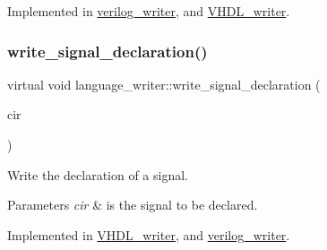 Implemented in \hyperlink{classverilog__writer_ab1e052e8bfd33f42202ec7c834c80039}{verilog\+\_\+writer}, and \hyperlink{structVHDL__writer_a24689039313dfd370692b4c13f2c8862}{V\+H\+D\+L\+\_\+writer}.

\mbox{\label{classlanguage__writer_ae574f2a7e9cb7904172ce08aab243f8e}} 
\subsubsection{\texorpdfstring{write\+\_\+signal\+\_\+declaration()}{write\_signal\_declaration()}}
{\footnotesize\ttfamily virtual void language\+\_\+writer\+::write\+\_\+signal\+\_\+declaration (\begin{DoxyParamCaption}\item[{const \hyperlink{structural__objects_8hpp_a8ea5f8cc50ab8f4c31e2751074ff60b2}{structural\+\_\+object\+Ref} \&}]{cir }\end{DoxyParamCaption})\hspace{0.3cm}{\ttfamily [pure virtual]}}



Write the declaration of a signal. 


\begin{DoxyParams}{Parameters}
{\em cir} & is the signal to be declared. \\
\hline
\end{DoxyParams}


Implemented in \hyperlink{structVHDL__writer_abbe0d08a850b90049d20cbc3ded0e132}{V\+H\+D\+L\+\_\+writer}, and \hyperlink{classverilog__writer_ad10d67870682d947144dac0629560742}{verilog\+\_\+writer}.

\mbox{\label{classlanguage__writer_a3325b6d77049e7f4bf39b1c4758df5e8}} 
